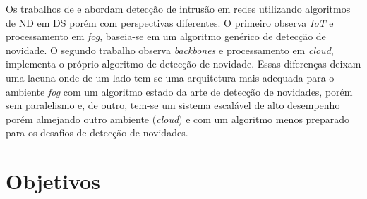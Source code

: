 

Os trabalhos de  e  abordam
detecção de intrusão em redes utilizando algoritmos de ND em DS porém com
perspectivas diferentes.
O primeiro observa \emph{IoT} e processamento em \emph{fog}, baseia-se em um
algoritmo genérico de detecção de novidade.
O segundo trabalho observa \emph{backbones} e processamento em \emph{cloud},
implementa o próprio algoritmo de detecção de novidade.
Essas diferenças deixam uma lacuna onde de um lado tem-se uma
arquitetura mais adequada para o ambiente \emph{fog} com um algoritmo estado da arte de
detecção de novidades, porém sem paralelismo e, de outro, tem-se um sistema
escalável de alto desempenho porém almejando outro ambiente (\emph{cloud}) e
com um algoritmo menos preparado para os desafios de detecção de novidades.


\section{Objetivos}\label{sec:objetivos}

